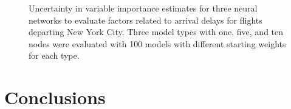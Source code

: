 \documentclass[article]{jss}
\begin{document}
\begin{figure}[t!]
\centering
{}


\caption{Uncertainty in variable importance estimates for three neural networks to evaluate factors related to arrival delays for flights departing New York City.  Three model types with one, five, and ten nodes were evaluated with 100 models with different starting weights for each type.}
\label{fig:flightimp}
\end{figure}

\section[Conclusions]{Conclusions}
\end{document}
